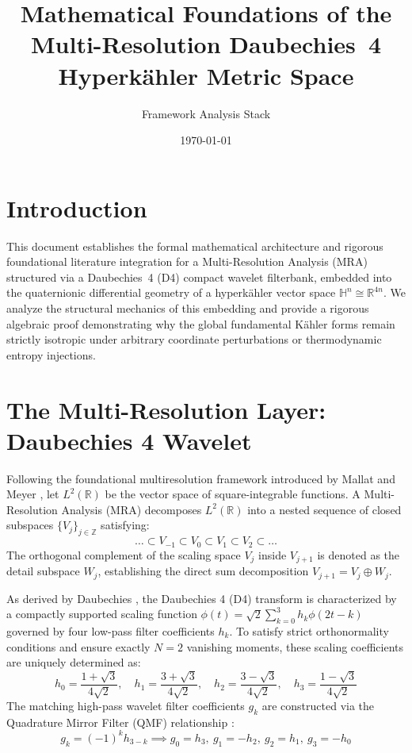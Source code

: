 \documentclass[11pt,preview,cite,epsf,twoside,amsfonts]{amsart}
\title{Mathematical Foundations of the Multi-Resolution Daubechies~4 Hyperk\"{a}hler Metric Space}
\author{Framework Analysis Stack}
\date{\today}
\begin{document}
\maketitle

\section{Introduction}
This document establishes the formal mathematical architecture and rigorous foundational literature integration for a Multi-Resolution Analysis (MRA) structured via a Daubechies~4 (D4) compact wavelet filterbank, embedded into the quaternionic differential geometry of a hyperk\"{a}hler vector space $\mathbb{H}^n \cong \mathbb{R}^{4n}$. We analyze the structural mechanics of this embedding and provide a rigorous algebraic proof demonstrating why the global fundamental K\"{a}hler forms remain strictly isotropic under arbitrary coordinate perturbations or thermodynamic entropy injections.

\section{The Multi-Resolution Layer: Daubechies 4 Wavelet}
Following the foundational multiresolution framework introduced by Mallat \cite{mallat1989theory} and Meyer \cite{meyer1992wavelets}, let $L^2(\mathbb{R})$ be the vector space of square-integrable functions. A Multi-Resolution Analysis (MRA) decomposes $L^2(\mathbb{R})$ into a nested sequence of closed subspaces $\{V_j\}_{j \in \mathbb{Z}}$ satisfying:
\begin{equation}
\dots \subset V_{-1} \subset V_0 \subset V_1 \subset V_2 \subset \dots
\end{equation}
The orthogonal complement of the scaling space $V_j$ inside $V_{j+1}$ is denoted as the detail subspace $W_j$, establishing the direct sum decomposition $V_{j+1} = V_j \oplus W_j$.

As derived by Daubechies \cite{daubechies1988orthonormal, daubechies1992ten}, the Daubechies 4 (D4) transform is characterized by a compactly supported scaling function $\phi(t) = \sqrt{2} \sum_{k=0}^{3} h_k \phi(2t-k)$ governed by four low-pass filter coefficients $h_k$. To satisfy strict orthonormality conditions and ensure exactly $N=2$ vanishing moments, these scaling coefficients are uniquely determined as:
\begin{equation}
h_0 = \frac{1 + \sqrt{3}}{4\sqrt{2}}, \quad h_1 = \frac{3 + \sqrt{3}}{4\sqrt{2}}, \quad h_2 = \frac{3 - \sqrt{3}}{4\sqrt{2}}, \quad h_3 = \frac{1 - \sqrt{3}}{4\sqrt{2}}
\end{equation}
The matching high-pass wavelet filter coefficients $g_k$ are constructed via the Quadrature Mirror Filter (QMF) relationship \cite{akansu1992multiresolution}:
\begin{equation}
g_k = (-1)^k h_{3-k} \implies g_0 = h_3, \ g_1 = -h_2, \ g_2 = h_1, \ g_3 = -h_0
\end{equation}
\end{document}
